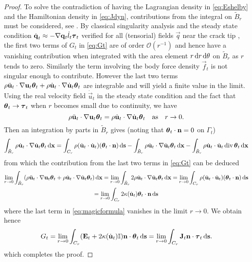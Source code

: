 \begin{proof}
To solve the contradiction of having the Lagrangian density in \eqref{eq:Eshelby} and the Hamiltonian density in \eqref{eq:Jdyn}, contributions from the integral on $\tilde{B}_r$ must be considered, see \cite{Maugin:1994}. By classical singularity analysis and the steady state condition $\dot{\vec{q}}_t\approx-\nabla\vec{q}_t\dot{l}_t\vtau_t$ verified for all (tensorial) fields $\vec{q}$ near the crack tip \cite{Freund:1990}, the first two terms of $G_t$ in \eqref{eq:Gt} are of order $\mathcal{O}(r^{-1})$ and hence have a vanishing contribution when integrated with the area element $r\,\mathrm{d}r\,\mathrm{d}\theta$ on $\tilde{B}_r$ as $r$ tends to zero. Similarly the term involving the body force density $\vec{f}_t$ is not singular enough to contribute. However the last two terms $\rho\ddot{\vec{u}}_t\cdot\nabla\vec{u}_t\vtheta_t+\rho\dot{\vec{u}}_t\cdot\nabla\dot{\vec{u}}_t\vtheta_t$ are integrable \cite{NishiokaAtluri:1983} and will yield a finite value in the limit. Using the real velocity field $\dot{\vec{u}}_t$ in the steady state condition and the fact that $\vtheta_t\to\vtau_t$ when $r$ becomes small due to continuity, we have
\[
\rho\ddot{\vec{u}}_t\cdot\nabla\vec{u}_t\vtheta_t=\rho\dot{\vec{u}}_t\cdot\nabla\dot{\vec{u}}_t\vtheta_t\quad\text{as}\quad r\to 0.
\]
Then an integration by parts in $\tilde{B}_r$ gives (noting that $\vtheta_t\cdot\vec{n}=0$ on $\Gamma_t$)
\begin{equation} \label{eq:magicformula}
\int_{\tilde{B}_r}\rho\dot{\vec{u}}_t\cdot\nabla\dot{\vec{u}}_t\vtheta_t\dx=\int_{C_r}\rho(\dot{\vec{u}}_t\cdot\dot{\vec{u}}_t)(\vtheta_t\cdot\vec{n})\ds-\int_{\tilde{B}_r}\rho\dot{\vec{u}}_t\cdot\nabla\dot{\vec{u}}_t\vtheta_t\dx-\int_{\tilde{B}_r}\rho\dot{\vec{u}}_t\cdot\dot{\vec{u}}_t\div\vtheta_t\dx
\end{equation}
from which the contribution from the last two terms in \eqref{eq:Gt} can be deduced
\begin{multline*}
\lim_{r\to 0}\int_{\tilde{B}_r}(\rho\ddot{\vec{u}}_t\cdot\nabla\vec{u}_t\vtheta_t+\rho\dot{\vec{u}}_t\cdot\nabla\dot{\vec{u}}_t\vtheta_t)\dx=\lim_{r\to 0}\int_{\tilde{B}_r}2\rho\dot{\vec{u}}_t\cdot\nabla\dot{\vec{u}}_t\vtheta_t\dx=\lim_{r\to 0}\int_{C_r}\rho(\dot{\vec{u}}_t\cdot\dot{\vec{u}}_t)(\vtheta_t\cdot\vec{n})\ds \\
=\lim_{r\to 0}\int_{C_r}2\kappa(\dot{\vec{u}}_t)\vtheta_t\cdot\vec{n}\ds
\end{multline*}
where the last term in \eqref{eq:magicformula} vanishes in the limit $r\to 0$. We obtain hence
\begin{equation}
G_t=\lim_{r\to 0}\int_{C_r}(\vec{E}_t+2\kappa(\dot{\vec{u}}_t)\mathbb{I})\vec{n}\cdot\vtheta_t\ds=\lim_{r\to 0}\int_{C_r}\vec{J}_t\vec{n}\cdot\vtau_t\ds.
\end{equation}
which completes the proof.
\end{proof}

